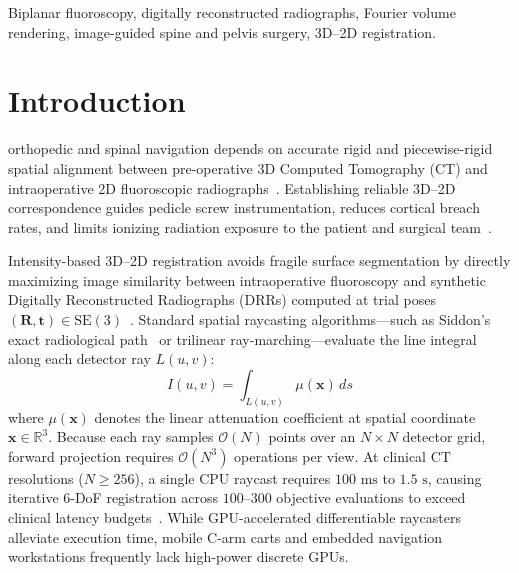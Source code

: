 \documentclass[journal]{IEEEtran}
\begin{document}
\begin{abstract}
PoU-FVR to isotropic $4{\times}4{\times}4@64$ slabs eliminates wide-field CT magnification drift ($100.0\% <2\text{ mm}$ standalone across all four clinical Spine and Abdominal CT cohorts: $0.307\text{--}1.406\text{ mm}$ median, and $91.7\% <2\text{ mm}$ on DeepFluoro), while pairing $K{=}4$ multi-survivor PoU-Triton with a $20$-step \texttt{f32} \texttt{nanodrr} polish after per-axis isocenter parity calibration achieves $\mathbf{0.835\text{ mm}}$ median mTRE ($\mathbf{100.0\% <2\text{ mm}}$ overall and on unanchored Tier~2) on DeepFluoro in $\mathbf{1.37\text{ s}}$ reg ($\mathbf{1.81\text{ s}}$ total) and only $\mathbf{464.1\text{ MB}}$ peak VRAM ($<0.5\text{ GB}$), alongside $0.046\text{--}0.642\text{ mm}$ median error on clinical Spine and Abdominal CT.
\end{abstract}

\begin{IEEEkeywords}
Biplanar fluoroscopy, digitally reconstructed radiographs, Fourier volume rendering, image-guided spine and pelvis surgery, 3D--2D registration.
\end{IEEEkeywords}

\section{Introduction}
 orthopedic and spinal navigation depends on accurate rigid and piecewise-rigid spatial alignment between pre-operative 3D Computed Tomography (CT) and intraoperative 2D fluoroscopic radiographs~\cite{markelj2012review,van2018evaluation}. Establishing reliable 3D--2D correspondence guides pedicle screw instrumentation, reduces cortical breach rates, and limits ionizing radiation exposure to the patient and surgical team~\cite{knez2020computer}.

Intensity-based 3D--2D registration avoids fragile surface segmentation by directly maximizing image similarity between intraoperative fluoroscopy and synthetic Digitally Reconstructed Radiographs (DRRs) computed at trial poses $(\mathbf{R}, \mathbf{t}) \in \mathrm{SE}(3)$~\cite{unberath2021impact}. Standard spatial raycasting algorithms---such as Siddon's exact radiological path~\cite{siddon1985fast} or trilinear ray-marching---evaluate the line integral along each detector ray $L(u,v)$:
\begin{equation}
I(u,v) = \int_{L(u,v)} \mu(\mathbf{x})\, ds
\end{equation}
where $\mu(\mathbf{x})$ denotes the linear attenuation coefficient at spatial coordinate $\mathbf{x} \in \mathbb{R}^3$. Because each ray samples $\mathcal{O}(N)$ points over an $N \times N$ detector grid, forward projection requires $\mathcal{O}(N^3)$ operations per view. At clinical CT resolutions ($N \ge 256$), a single CPU raycast requires $100\text{ ms}$ to $1.5\text{ s}$, causing iterative 6-DoF registration across $100$--$300$ objective evaluations to exceed clinical latency budgets~\cite{gopalakrishnan2022drr,killeen2023diffdrr}. While GPU-accelerated differentiable raycasters alleviate execution time, mobile C-arm carts and embedded navigation workstations frequently lack high-power discrete GPUs.
\end{document}
